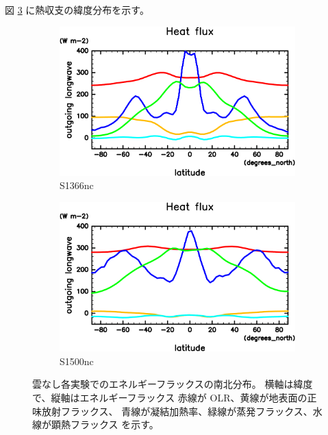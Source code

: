 \documentclass[body]{subfiles}
\begin{document}
図 \ref{EnFlx南北分布nc} に熱収支の緯度分布を示す。

\begin{figure}[t]
	\centering
	\begin{subfigure}{.4\textwidth}
		\centering
		\includegraphics[width=\textwidth]{S1366-nc/HeatFlx,time=3650:4015-crop-rotate.pdf}
		\caption{S1366nc}\label{EnFlx南北分布S1366nc}
	\end{subfigure}
	\begin{subfigure}{.4\textwidth}
		\centering
		\includegraphics[width=\textwidth]{S1500-nc/HeatFlx,time=3650:4015-crop-rotate.pdf}
		\caption{S1500nc}\label{EnFlx南北分布S1500nc}
	\end{subfigure}
	\caption[雲なし各実験でのエネルギーフラックス南北分布]{
		雲なし各実験でのエネルギーフラックスの南北分布。
		横軸は緯度で、縦軸はエネルギーフラックス\hmu*{[W/m^{-2}]}
		赤線が OLR、黄線が地表面の正味放射フラックス、
		青線が凝結加熱率、緑線が蒸発フラックス、水線が顕熱フラックス
		を示す。
	}\label{EnFlx南北分布nc}
\end{figure}
\end{document}
